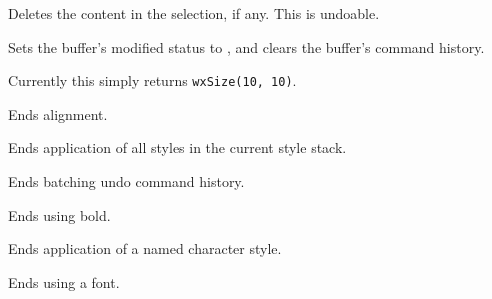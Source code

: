 \label{wxrichtextctrldeleteselection}


Deletes the content in the selection, if any. This is undoable.

\label{wxrichtextctrldiscardedits}


Sets the buffer's modified status to \false, and clears the buffer's command history.

\label{wxrichtextctrldogetbestsize}


Currently this simply returns {\tt wxSize(10, 10)}.

\label{wxrichtextctrlendalignment}


Ends alignment.

\label{wxrichtextctrlendallstyles}


Ends application of all styles in the current style stack.

\label{wxrichtextctrlendbatchundo}


Ends batching undo command history.

\label{wxrichtextctrlendbold}


Ends using bold.

\label{wxrichtextctrlendcharacterstyle}


Ends application of a named character style.

\label{wxrichtextctrlendfont}


Ends using a font.

\label{wxrichtextctrlendfontsize}


